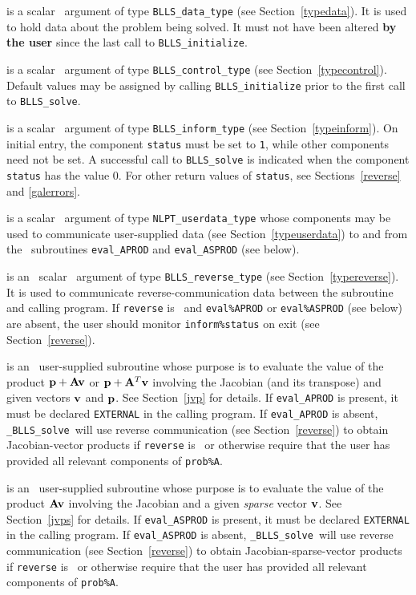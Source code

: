 \documentclass{galahad}
\newcommand{\packagename}{BLLS}
\newcommand{\fullpackagename}{\libraryname\_\packagename}
\newcommand{\solver}{{\tt \fullpackagename\_solve}}
\begin{document}
\begin{description}
 is a scalar \intentinout\ argument of type
{\tt \packagename\_data\_type}
(see Section~\ref{typedata}). It is used to hold data about the problem being
solved. It must not have been altered {\bf by the user} since the last call to
{\tt \packagename\_initialize}.

 is a scalar \intentin\ argument of type
{\tt \packagename\_control\_type}
(see Section~\ref{typecontrol}). Default values may be assigned by calling
{\tt \packagename\_initialize} prior to the first call to
{\tt \packagename\_solve}.

 is a scalar \intentinout\ argument of type
{\tt \packagename\_inform\_type}
(see Section~\ref{typeinform}). On initial entry, the component {\tt status}
must be set to {\tt 1}, while other components need not be set.
A successful call to
{\tt \packagename\_solve}
is indicated when the  component {\tt status} has the value 0.
For other return values of {\tt status}, see Sections~\ref{reverse} and
\ref{galerrors}.

 is a scalar \intentinout\ argument of type
{\tt NLPT\_userdata\_type} whose components may be used
to communicate user-supplied data
(see Section~\ref{typeuserdata})
to and from the \optional\ subroutines
 {\tt eval\_APROD} and {\tt eval\_ASPROD} (see below).

 is an \optional\ scalar \intentinout\ argument of type
{\tt \packagename\_reverse\_type}
(see Section~\ref{typereverse}).
It is used to communicate reverse-communication data between the
subroutine and calling program.
If {\tt reverse} is \present\ and {\tt eval\%APROD} or {\tt eval\%ASPROD}
(see below) are absent, the user should monitor {\tt inform\%status} on exit
(see Section~\ref{reverse}).

 is an \optional\
user-supplied subroutine whose purpose is to evaluate the value of the
product ${\mathbf{p}} + {\mathbf{A}} {\mathbf{v}}$ or ${\mathbf{p}} + {\mathbf{A}}^T {\mathbf{v}}$
involving the Jacobian (and its transpose) and given vectors ${\mathbf{v}}$ and ${\mathbf{p}}$.
See Section~\ref{jvp} for details.
If {\tt eval\_APROD} is present,
it must be declared {\tt EXTERNAL} in the calling program.
If {\tt eval\_APROD} is absent, \solver\ will use reverse communication
(see Section~\ref{reverse})
to obtain Jacobian-vector products if {\tt reverse} is \present\ or
otherwise require that the user has provided all relevant
components of {\tt prob\%A}.

 is an \optional\
user-supplied subroutine whose purpose is to evaluate the value of the
product ${\mathbf{A}} {\mathbf{v}}$  involving the Jacobian and a given {\em sparse}
vector ${\mathbf{v}}$.
See Section~\ref{jvps} for details.
If {\tt eval\_ASPROD} is present,
it must be declared {\tt EXTERNAL} in the calling program.
If {\tt eval\_ASPROD} is absent, \solver\ will use reverse communication
(see Section~\ref{reverse})
to obtain Jacobian-sparse-vector products if {\tt reverse} is \present\ or
otherwise require that the user has provided all relevant
components of {\tt prob\%A}.


\end{description}
\end{document}
